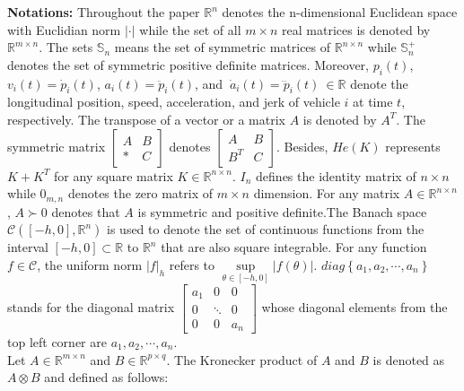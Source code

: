 \documentclass[a4paper]{cas-sc}
\begin{document}
\textbf{Notations:} Throughout the paper ${\mathbb{R}^n}$ denotes the n-dimensional Euclidean space with Euclidian norm $| \cdot |$ while the set of all $m \times n$ real matrices is denoted by ${\mathbb{R}^{m \times n}}$. The sets $ {\mathbb{S}_n} $ means the set of symmetric matrices of ${\mathbb{R}^{n \times n}}$ while $\mathbb{S}_n^ + $ denotes the set of symmetric positive definite matrices. Moreover, $p_i\left(t\right)$, $v_i\left(t\right)={\dot{p}}_i\left(t\right)$, $a_i\left(t\right)={\ddot{p}}_i\left(t\right)$, and $\ {\dot{a}}_i\left(t\right)={\dddot{p}}_i\left(t\right)\ \in\mathbb{R}$ denote the longitudinal position, speed, acceleration, and jerk of vehicle $i$ at time $t$, respectively. The transpose of a vector or a matrix $A $ is denoted by ${A^T} $. The symmetric matrix $\left[ {\begin{array}{*{20}{c}}
  A & B \\
  * & C
\end{array}} \right]$ denotes $\left[ {\begin{array}{*{20}{c}}
  A       & B \\
  {{B^T}} & C
\end{array}} \right]$. Besides, $ He\left( K \right)$ represents $K + {K^T}$ for any square matrix $ K \in {\mathbb{R}^{n \times n}}$. ${I_n} $ defines the identity matrix of $ n \times n $ while ${0_{m,n}} $ denotes the zero matrix of $ m \times n$ dimension. For any matrix $A \in {\mathbb{R}^{n \times n}} $, $ A \succ 0$ denotes that $A $ is symmetric and positive definite.The Banach space $\mathcal{C}\left( {\left[ { - h,0} \right],{\mathbb{R}^n}} \right)$ is used to denote the set of continuous functions from the interval $\left[ { - h,0} \right] \subset \mathbb{R}$ to ${\mathbb{R}^n}$ that are also square integrable. For any function $f \in \mathcal{C}$, the uniform norm $|f{|_h}$ refers to $\mathop {\sup }\limits_{\theta  \in [ - h,0]} |f(\theta )|$. $diag\left\{ {{a_1},{a_2}, \cdots ,{a_n}} \right\}$ stands for the diagonal matrix $\left[ {\begin{array}{*{20}{c}}
  {{a_1}} & 0      & 0       \\
  0       & \ddots & 0       \\
  0       & 0      & {{a_n}}
\end{array}} \right]$ whose diagonal elements from the top left corner are ${a_1},{a_2}, \cdots ,{a_n}$.\\
Let $A \in {\mathbb{R}^{m \times n}}$ and $B \in {\mathbb{R}^{p \times q}}$. The Kronecker product of $A$ and $B$ is denoted as $A \otimes B$ and defined as follows:
\end{document}
